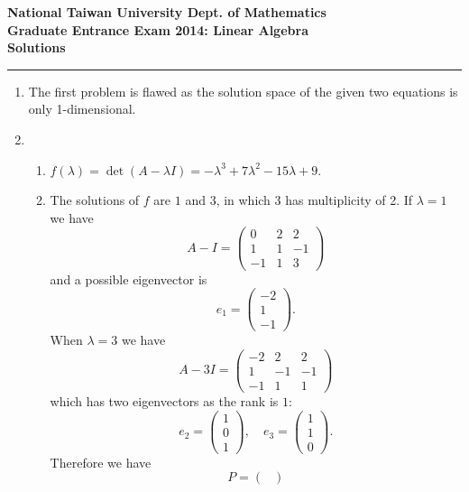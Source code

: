 
\begin{center}
    \textbf{National Taiwan University Dept. of Mathematics \\ Graduate Entrance Exam 2014: Linear Algebra \\ Solutions} 
    \noindent\rule{\textwidth}{0.4pt}
\end{center}

\begin{enumerate}
    \item The first problem is flawed as the solution space of the given two equations is only 1-dimensional.
    \item 
    \begin{enumerate}[label=(\arabic*)]
        \item $f(\lambda) = \det(A - \lambda I) = - \lambda^{3} + 7 \lambda^{2} - 15 \lambda + 9$. 
        \item The solutions of $f$ are $1$ and $3$, in which $3$ has multiplicity of 2. If $\lambda = 1$ we have
        \[ A-I = 
        \begin{pmatrix}
        0 & 2 & 2 \\
        1 & 1 & -1 \\
        -1 & 1 & 3
        \end{pmatrix}
        \]
        and a possible eigenvector is 
        \[
        e_1 = 
        \begin{pmatrix}
        -2 \\ 1 \\ -1
        \end{pmatrix}
        .\]
        When $\lambda = 3$ we have
        \[ A-3I = 
        \begin{pmatrix}
        -2 & 2 & 2 \\
        1 & -1 & -1 \\
        -1 & 1 & 1
        \end{pmatrix}
        \]
        which has two eigenvectors as the rank is $1$:
        \[
        e_2 = 
        \begin{pmatrix}
        1 \\ 0 \\ 1
        \end{pmatrix}, \quad
        e_3 = 
        \begin{pmatrix}
        1 \\ 1 \\ 0
        \end{pmatrix}.
        \]
        Therefore we have
        \[
        P = 
        \begin{pmatrix}

\end{pmatrix}\]
\end{enumerate}
\end{enumerate}
